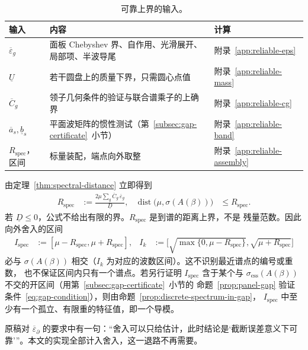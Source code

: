 \begin{table}[htbp]
  \centering
  \caption{可靠上界的输入。}
  \label{tab:certified-inputs}
  \begin{tabular}{lll}
    \toprule
    输入 & 内容 & 计算 \\
    \midrule
    $\overline\varepsilon_g$ & 面板 Chebyshev 界、自作用、光滑展开、局部项、半波导尾 & 附录~\ref{app:reliable-eps} \\
    $\underline U$ & 若干圆盘上的质量下界，只需圆心点值 & 附录~\ref{app:reliable-mass} \\
    $\overline C_g$ & 领子几何条件的验证与联合谱乘子的上确界 & 附录~\ref{app:reliable-cg} \\
    $\overline a_s,\underline b_s$ & 平面波矩阵的惯性测试（第~\ref{subsec:gap-certificate}~小节） & 附录~\ref{app:reliable-band} \\
    $R_{\mathrm{spec}}$，区间 & 标量装配，端点向外取整 & 附录~\ref{app:reliable-assembly} \\
    \bottomrule
  \end{tabular}
\end{table}

由定理~\ref{thm:spectral-distance} 立即得到
\begin{align}
  R_{\mathrm{spec}}
  &:=\frac{2\mu\sum_g\overline C_g\,\overline\varepsilon_g}{\underline D},
  &\operatorname{dist}\bigl(\mu,\sigma(A(\beta))\bigr)&\leq R_{\mathrm{spec}}.
  \label{eq:certified-spectral-distance}
\end{align}
若 $\underline D\leq0$，公式不给出有限的界。$R_{\mathrm{spec}}$ 是到谱的距离上界，不是
残量范数。因此向外舍入的区间
\begin{align}
  I_{\mathrm{spec}}&:=[\mu-R_{\mathrm{spec}},\mu+R_{\mathrm{spec}}],
  &I_k&:=\bigl[\sqrt{\max\{0,\mu-R_{\mathrm{spec}}\}},\sqrt{\mu+R_{\mathrm{spec}}}\bigr]
  \label{eq:certified-spectral-interval}
\end{align}
必与 $\sigma(A(\beta))$ 相交（$I_k$ 为对应的波数区间）。这不识别最近谱点的编号或重数，
也不保证区间内只有一个谱点。若另行证明 $I_{\mathrm{spec}}$ 含于某个与
$\sigma_{\mathrm{ess}}(A(\beta))$ 不交的开区间（用第~\ref{subsec:gap-certificate}~小节的
命题~\ref{prop:panel-gap} 验证条件~\eqref{eq:gap-condition}），则由命题~\ref{prop:discrete-spectrum-in-gap}，
$I_{\mathrm{spec}}$ 中至少有一个孤立、有限重的特征值，即一个导模。

\begin{workonly}
原稿对 $\overline\varepsilon_\partial$ 的要求中有一句：“舍入可以只给估计，此时结论是‘截断误差意义下可靠’”。本文的实现全部计入舍入，这一退路不再需要。
\end{workonly}


